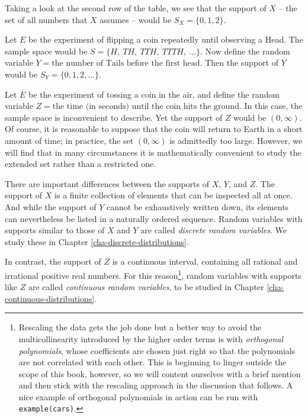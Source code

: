 \documentclass[]{book}
\let\rmarkdownfootnote\footnote%
\def\footnote{\protect\rmarkdownfootnote}
\numberwithin{equation}{chapter}
\numberwithin{figure}{chapter}
\theoremstyle{plain}
\theoremstyle{definition}
\theoremstyle{remark}
\theoremstyle{definition}
\theoremstyle{definition}
\theoremstyle{remark}
\let\BeginKnitrBlock\begin \let\EndKnitrBlock\end
\begin{document}
Taking a look at the second row of the table, we see that the support of
\(X\) -- the set of all numbers that \(X\) assumes -- would be
\(S_{X}= \{ 0,1,2 \}\).

\bigskip

\BeginKnitrBlock{example}
\protect\hypertarget{ex:unnamed-chunk-185}{}{\label{ex:unnamed-chunk-185}}Let
\(E\) be the experiment of flipping a coin repeatedly until observing a
Head. The sample space would be \(S= \{ H,\ TH,\ TTH,\
TTTH,\ \ldots \}\). Now define the random variable
\(Y=\mbox{the number of Tails before the first head}\). Then the support
of \(Y\) would be \(S_{Y}= \{ 0,1,2,\ldots \}\).
\EndKnitrBlock{example}

\bigskip

\BeginKnitrBlock{example}
\protect\hypertarget{ex:unnamed-chunk-186}{}{\label{ex:unnamed-chunk-186}}Let
\(E\) be the experiment of tossing a coin in the air, and define the
random variable
\(Z = \mbox{the time (in seconds) until the coin hits the ground}\). In
this case, the sample space is inconvenient to describe. Yet the support
of \(Z\) would be \((0,\infty)\). Of course, it is reasonable to suppose
that the coin will return to Earth in a short amount of time; in
practice, the set \((0,\infty)\) is admittedly too large. However, we
will find that in many circumstances it is mathematically convenient to
study the extended set rather than a restricted one.
\EndKnitrBlock{example}

There are important differences between the supports of \(X\), \(Y\),
and \(Z\). The support of \(X\) is a finite collection of elements that
can be inspected all at once. And while the support of \(Y\) cannot be
exhaustively written down, its elements can nevertheless be listed in a
naturally ordered sequence. Random variables with supports similar to
those of \(X\) and \(Y\) are called \emph{discrete random variables}. We
study these in Chapter \ref{cha-discrete-distributions}.

In contrast, the support of \(Z\) is a continuous interval, containing
all rational and irrational positive real numbers. For this
reason\footnote{Rescaling the data gets the job done but a better way to
  avoid the multicollinearity introduced by the higher order terms is
  with \emph{orthogonal polynomials}, whose coefficients are chosen just
  right so that the polynomials are not correlated with each other. This
  is beginning to linger outside the scope of this book, however, so we
  will content ourselves with a brief mention and then stick with the
  rescaling approach in the discussion that follows. A nice example of
  orthogonal polynomials in action can be run with
  \texttt{example(cars)}.}, random variables with supports like \(Z\)
are called \emph{continuous random variables}, to be studied in Chapter
\ref{cha-continuous-distributions}.
\end{document}
